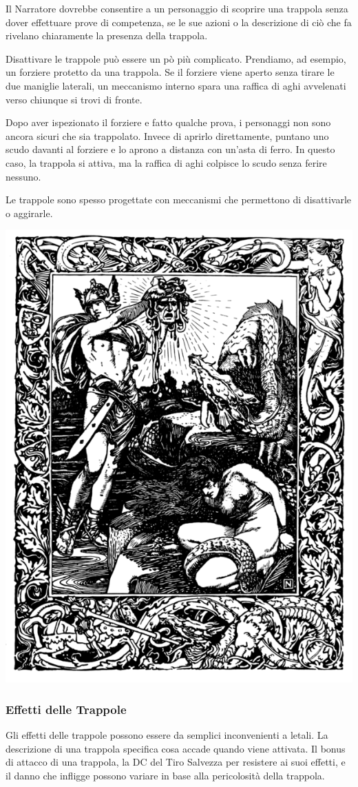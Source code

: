 \begin{multicols}{2}
Il Narratore dovrebbe consentire a un personaggio di scoprire una trappola senza dover effettuare prove di competenza, se le sue azioni o la descrizione di ciò che fa rivelano chiaramente la presenza della trappola.

Disattivare le trappole può essere un pò più complicato. Prendiamo, ad esempio, un forziere protetto da una trappola. Se il forziere viene aperto senza tirare le due maniglie laterali, un meccanismo interno spara una raffica di aghi avvelenati verso chiunque si trovi di fronte.

Dopo aver ispezionato il forziere e fatto qualche prova, i personaggi non sono ancora sicuri che sia trappolato. Invece di aprirlo direttamente, puntano uno scudo davanti al forziere e lo aprono a distanza con un'asta di ferro. In questo caso, la trappola si attiva, ma la raffica di aghi colpisce lo scudo senza ferire nessuno.

Le trappole sono spesso progettate con meccanismi che permettono di disattivarle o aggirarle.

\medskip

\begin{center}
\includegraphics[width=0.7\linewidth]{immagini/medusa.png}
\end{center}

\subsubsection{Effetti delle Trappole}
Gli effetti delle trappole possono essere da semplici inconvenienti a letali. La descrizione di una trappola specifica cosa accade quando viene attivata.
Il bonus di attacco di una trappola, la DC del Tiro Salvezza per resistere ai suoi effetti, e il danno che infligge possono variare in base alla pericolosità della trappola.


\end{multicols}
